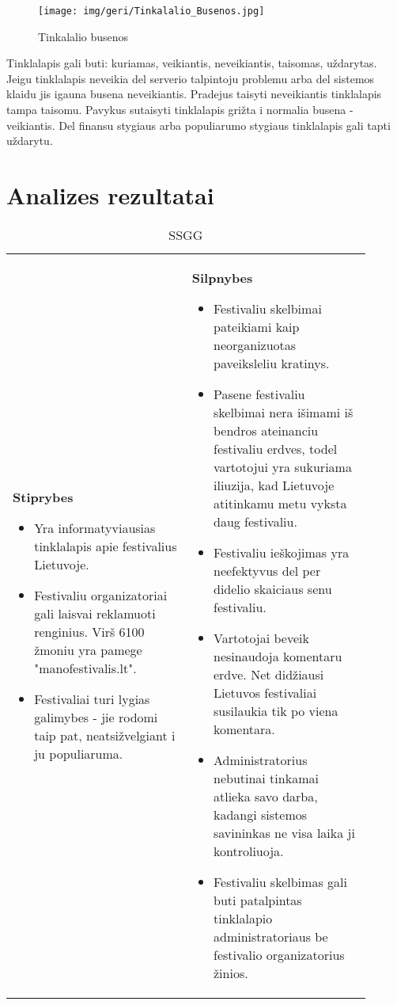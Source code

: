 ﻿\documentclass{VUMIFPSkursinis}
\begin{document}
{{\begin{figure}[H]
    \centering
    \texttt{[image: img/geri/Tinkalalio\_Busenos.jpg]}
    \label{img:uml20}
	\caption{Tinkalalio busenos}
\end{figure}
Tinklalapis gali buti: kuriamas, veikiantis, neveikiantis, taisomas, uždarytas. Jeigu tinklalapis neveikia del serverio talpintoju problemu arba del sistemos klaidu jis igauna busena neveikiantis. Pradejus taisyti neveikiantis tinklalapis tampa taisomu. Pavykus sutaisyti tinklalapis grižta i normalia busena - veikiantis. Del finansu stygiaus arba populiarumo stygiaus tinklalapis gali tapti uždarytu.

\section{Analizes rezultatai}
\begin{longtable}{|p{0.45\linewidth}|p{0.45\linewidth}|} 
  \caption{SSGG}\\
  \hline
  \textbf{Stiprybes}
  \begin{itemize}
	\item Yra informatyviausias tinklalapis apie festivalius Lietuvoje.
	\item Festivaliu organizatoriai gali laisvai reklamuoti renginius. Virš 6100 žmoniu yra pamege "manofestivalis.lt".
	\item Festivaliai turi lygias galimybes - jie rodomi taip pat, neatsižvelgiant i ju populiaruma.
  \end{itemize}
  &
  \textbf{Silpnybes}
  \begin{itemize}
	\item Festivaliu skelbimai pateikiami kaip neorganizuotas paveiksleliu kratinys.
	\item Pasene festivaliu skelbimai nera išimami iš bendros ateinanciu festivaliu erdves, todel vartotojui yra sukuriama iliuzija, kad Lietuvoje atitinkamu metu vyksta daug festivaliu.
	\item Festivaliu ieškojimas yra neefektyvus del per didelio skaiciaus senu festivaliu.
	\item Vartotojai beveik nesinaudoja komentaru erdve. Net didžiausi Lietuvos festivaliai susilaukia tik po viena komentara.
	\item Administratorius nebutinai tinkamai atlieka savo darba, kadangi sistemos savininkas ne visa laika ji kontroliuoja.
	\item Festivaliu skelbimas gali buti patalpintas tinklalapio administratoriaus be festivalio organizatorius žinios.

\end{itemize}
\end{longtable}}}
\end{document}
